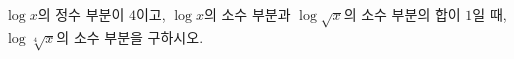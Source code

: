 $\log x$의 정수 부분이 $4$이고, $\log x$의 소수 부분과 $\log\sqrt{x}$의 소수 부분의 합이 $1$일 때, $\log\sqrt[4]{x}$의 소수 부분을 구하시오.
